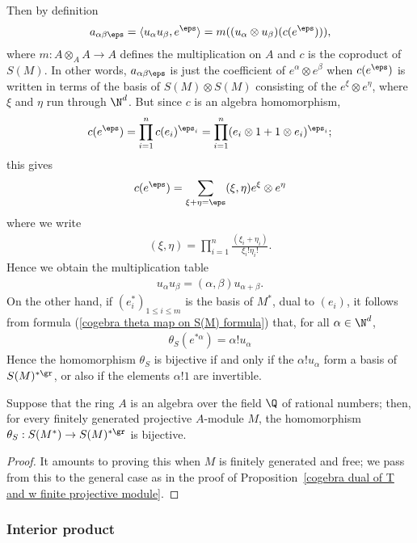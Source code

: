 Then by definition
\[a_{\alpha\beta\eps}=\langle u_\alpha u_\beta,e^\eps\rangle=m((u_\alpha\otimes u_\beta)(c(e^\eps))),\]
where $m:A\otimes_AA\to A$ defines the multiplication on $A$ and $c$ is the coproduct of $S(M)$. In other words, $a_{\alpha\beta\eps}$ is just the coefficient of $e^\alpha\otimes e^\beta$ when $c(e^\eps)$ is written in terms of the basis of $S(M)\otimes S(M)$ consisting of the $e^\xi\otimes e^\eta$, where $\xi$ and $\eta$ run through $\N^d$. But since $c$ is an algebra homomorphism,
\[c(e^\eps)=\prod_{i=1}^{n}c(e_i)^{\eps_i}=\prod_{i=1}^{n}(e_i\otimes 1+1\otimes e_i)^{\eps_i};\]
this gives
\begin{align}\label{cogebra S(M) coproduct on basis formula-1}
c(e^\eps)=\sum_{\xi+\eta=\eps}(\xi,\eta)e^\xi\otimes e^\eta
\end{align}
where we write
\begin{align}\label{cogebra S(M) coproduct coefficient def}
(\xi,\eta)=\prod_{i=1}^{n}\frac{(\xi_i+\eta_i)}{\xi_i!\eta_i!}.
\end{align}
Hence we obtain the multiplication table
\begin{align}\label{cogebra S(M) coproduct on basis formula-2}
u_\alpha u_\beta=(\alpha,\beta)u_{\alpha+\beta}.
\end{align}
On the other hand, if $(e_i^*)_{1\leq i\leq m}$ is the basis of $M^*$, dual to $(e_i)$, it follows from formula (\ref{cogebra theta map on S(M) formula}) that, for all $\alpha\in\N^d$,
\begin{align}
\theta_S(e^{*\alpha})=\alpha!u_\alpha
\end{align}
Hence the homomorphism $\theta_S$ is bijective if and only if the $\alpha!u_\alpha$ form a basis of $S(M)^{*\gr}$, or also if the elements $\alpha!1$ are invertible.
\begin{proposition}\label{cogebra dual of S finite projective module}
Suppose that the ring $A$ is an algebra over the field $\Q$ of rational numbers; then, for every finitely generated projective $A$-module $M$, the homomorphism $\theta_S:S(M^*)\to S(M)^{*\gr}$ is bijective.
\end{proposition}
\begin{proof}
It amounts to proving this when $M$ is finitely generated and free; we pass from this to the general case as in the proof of Proposition~\ref{cogebra dual of T and w finite projective module}.
\end{proof}
\subsubsection{Interior product}
